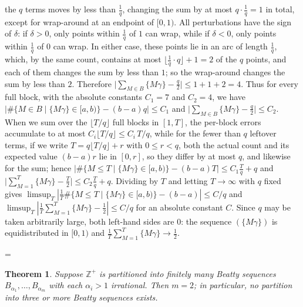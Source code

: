 \documentclass[11pt]{article}
\makeatletter
\theoremstyle{ntstyle}
\newtheorem{theorem}{Theorem}[subsection]
\let\nt@closedisplay\]
\def\nt@guardedclose{\@ifnextchar\par{\nt@closeafterpar}{\@ifnextchar\end{\postdisplaypenalty\@M\nt@closedisplay}{\nt@closedisplay}}}
\def\nt@closeafterpar\par{\@ifnextchar\par{\nt@closeafterpar}{\@ifnextchar\end{\postdisplaypenalty\@M\nt@closedisplay\par}{\nt@closedisplay\par}}}
\renewenvironment{proof}[1][\proofname]{\par
  \pushQED{\qed}\normalfont\topsep\medskipamount\edef\nt@afterproof{\@endparpenalty=\the\@endparpenalty\relax}\@beginparpenalty\@M\@endparpenalty\@M\let\]\nt@guardedclose\trivlist\item[]\textit{#1\@addpunct{.}} \ignorespaces}{\ifvmode\addpenalty\@M\fi\popQED\nt@afterproof\endtrivlist\@endpefalse}
\makeatother
\begin{document}
\begin{proof}
	the $q$ terms moves by less than $\tfrac{1}{q}$, changing the sum by at most
	$q\cdot\tfrac{1}{q}=1$ in total, except for wrap-around at an endpoint
	of $[0,1)$. All perturbations have the sign of $\delta$: if $\delta>0$,
	only points within $\tfrac{1}{q}$ of $1$ can wrap, while if $\delta<0$,
	only points within $\tfrac{1}{q}$ of $0$ can wrap. In either case, these
	points lie in an arc of length $\tfrac{1}{q}$, which, by the same count, contains at most
	$\lfloor\tfrac{1}{q}\cdot q\rfloor + 1 = 2$ of the $q$ points, and each
	of them changes the sum by less than $1$; so the wrap-around changes the
	sum by less than $2$. Therefore
	$\big|\sum_{M\in B}\{M\gamma\}-\tfrac{q}{2}\big|\le 1+1+2=4$.
	Thus for every full block, with the absolute constants $C_1=7$ and
	$C_2=4$, we have $\big|\#\{M\in B \mid \{M\gamma\}\in[a,b)\}-(b-a)q\big|\le C_1$
	and $\big|\sum_{M\in B}\{M\gamma\}-\tfrac{q}{2}\big|\le C_2$. When we sum
	over the $\lfloor T/q\rfloor$ full blocks in $[1,T]$, the per-block
	errors accumulate to at most $C_i\lfloor T/q\rfloor\le C_i\,T/q$,
	while for the fewer than $q$ leftover terms, if we write
	$T=q\lfloor T/q\rfloor+r$ with $0\le r<q$, both the actual count and
	its expected value $(b-a)r$ lie in $[0,r]$, so they differ by at
	most $q$, and likewise for the sum; hence $\big|\#\{M\le
		T \mid \{M\gamma\}\in[a,b)\}-(b-a)T\big|\le C_1\tfrac{T}{q}+q$ and
	$\big|\sum_{M=1}^T\{M\gamma\}-\tfrac{T}{2}\big|\le C_2\tfrac{T}{q}+q$.
	Dividing by $T$ and letting $T\to\infty$ with $q$ fixed gives
	$\limsup_T|\tfrac{1}{T}\#\{M\le T \mid \{M\gamma\}\in[a,b)\}-(b-a)|\le C/q$
	and $\limsup_T|\tfrac{1}{T}\sum_{M=1}^T\{M\gamma\}-\tfrac{1}{2}|\le C/q$ for
	an absolute constant $C$. Since $q$ may be taken arbitrarily large,
	both left-hand sides are $0$: the sequence $(\{M\gamma\})$ is
	equidistributed in $[0,1)$ and
	$\tfrac{1}{T}\sum_{M=1}^T\{M\gamma\}\to\tfrac{1}{2}$.

\end{proof}
\begin{theorem}\label{thm:10.2.3} Suppose $\mathbb{Z}^+$
	is partitioned into finitely many Beatty sequences
	$B_{\alpha_1},\ldots,B_{\alpha_m}$ with each $\alpha_i>1$ irrational.
	Then $m=2$; in particular, no partition into three or more Beatty
	sequences exists.

\end{theorem}
\end{document}
